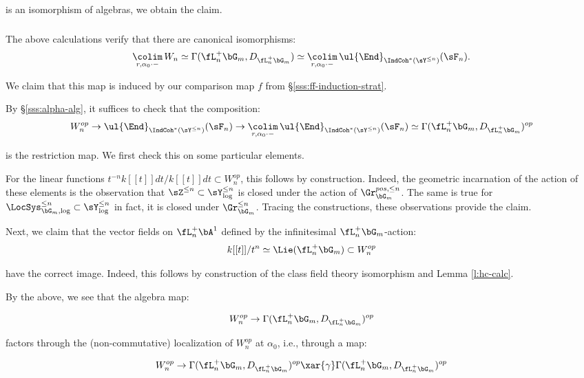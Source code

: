  is an isomorphism of algebras, we obtain the claim.

\subsubsection{}\label{sss:lcft-compat-left}

The above calculations verify that there are canonical isomorphisms:
%
\[
\underset{r,\alpha_0\cdot-}{\colim} \, W_n \simeq
\Gamma(\fL_n^+ \bG_m,D_{\fL_n^+ \bG_m}) \simeq
\underset{r,\alpha_0\cdot-}{\colim} \, \ul{\End}_{\IndCoh^*(\sY^{\leq n})}(\sF_n).
\]

We claim that this map is induced by our comparison map $f$ from
\S \ref{sss:ff-induction-strat}.

By \S \ref{sss:alpha-alg}, it suffices to check that the composition:
%
\[
W_n^{op} \to \ul{\End}_{\IndCoh^*(\sY^{\leq n})}(\sF_n)
\to
\underset{r,\alpha_0\cdot-}{\colim} \, \ul{\End}_{\IndCoh^*(\sY^{\leq n})}(\sF_n)
\simeq \Gamma(\fL_n^+ \bG_m,D_{\fL_n^+ \bG_m})^{op}
\]

 is the restriction map. We first check this on some particular elements.

For the linear functions $t^{-n}k[[t]]dt/k[[t]]dt \subset W_n^{op}$,
this follows by construction. Indeed, the geometric incarnation of the
action of these elements is the observation that
$\sZ^{\leq n} \subset \sY_{\log}^{\leq n}$ is closed under
the action of $\Gr_{\bG_m}^{pos,\leq n}$. The same is true
for $\LocSys_{\bG_m,\log}^{\leq n} \subset \sY_{\log}^{\leq n}$ \textemdash{}
in fact, it is closed under $\Gr_{\bG_m}^{\leq n}$. Tracing the
constructions, these observations provide the claim.

Next, we claim that the vector fields on $\fL_n^+\bA^1$ defined by the
infinitesimal $\fL_n^+\bG_m$-action:
%
\[
k[[t]]/t^n \simeq \Lie(\fL_n^+\bG_m) \subset W_n^{op}
\]

 have the correct image. Indeed, this follows by
construction of the class field theory isomorphism and Lemma \ref{l:hc-calc}.

By the above, we see that the algebra map:

\[
W_n^{op} \to \Gamma(\fL_n^+ \bG_m,D_{\fL_n^+ \bG_m})^{op}
\]

 factors through the (non-commutative) localization of
$W_n^{op}$ at $\alpha_0$, i.e., through a map:

\[
W_n^{op} \to \Gamma(\fL_n^+ \bG_m,D_{\fL_n^+ \bG_m})^{op} \xar{\gamma}
\Gamma(\fL_n^+ \bG_m,D_{\fL_n^+ \bG_m})^{op}
\]

